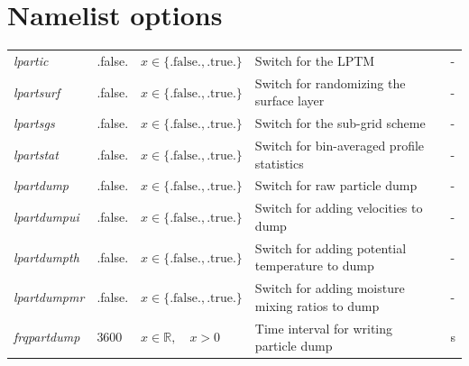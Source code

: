 \documentclass[twoside,a4paper]{report}
\begin{document}
\clearpage
\section{Namelist options}
\label{sec:namelist}

\begin{center}
  \tablelasttail{
        &&&&\\\hline
  }
\begin{supertabular}{|l|p{1.2cm}|p{3cm}|p{5.0cm}|l|}
  \textit{lpartic}	& .false.	& $x\in\{\text{.false.},\text{.true.}\}$	& Switch for the LPTM					& -\\
  \textit{lpartsurf}	& .false.	& $x\in\{\text{.false.},\text{.true.}\}$	& Switch for randomizing the surface layer		& -\\
  \textit{lpartsgs}	& .false.	& $x\in\{\text{.false.},\text{.true.}\}$	& Switch for the sub-grid scheme				& -\\
  \textit{lpartstat}	& .false.	& $x\in\{\text{.false.},\text{.true.}\}$	& Switch for bin-averaged profile statistics 		& -\\
  \textit{lpartdump}	& .false.	& $x\in\{\text{.false.},\text{.true.}\}$	& Switch for raw particle dump				& -\\
  \textit{lpartdumpui}	& .false.	& $x\in\{\text{.false.},\text{.true.}\}$	& Switch for adding velocities to dump 			& -\\
  \textit{lpartdumpth}	& .false.	& $x\in\{\text{.false.},\text{.true.}\}$	& Switch for adding potential temperature to dump	& -\\
  \textit{lpartdumpmr}	& .false.	& $x\in\{\text{.false.},\text{.true.}\}$	& Switch for adding moisture mixing ratios to dump	& -\\
  \textit{frqpartdump}	& 3600		& $x \in \mathbb{R}, \quad x>0$			& Time interval for writing particle dump		& s\\
\end{supertabular}
\end{center}
\end{document}
